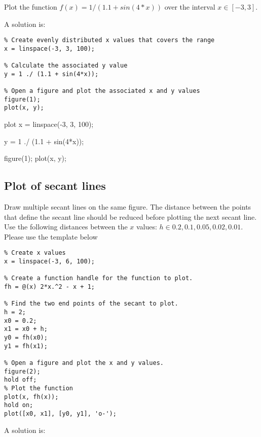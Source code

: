 \begin{ex}
Plot the function $f(x) = 1 / (1.1 + sin(4*x))$
over the interval $x \in [-3, 3]$.
\begin{hint}
\end{hint}
\begin{sol}
A solution is:
\begin{lstlisting}
% Create evenly distributed x values that covers the range
x = linspace(-3, 3, 100);

% Calculate the associated y value
y = 1 ./ (1.1 + sin(4*x));

% Open a figure and plot the associated x and y values
figure(1);
plot(x, y);
\end{lstlisting}
\end{sol}
\begin{solutionfile}{plot}
x = linspace(-3, 3, 100);

y = 1 ./ (1.1 + sin(4*x));

figure(1);
plot(x, y);
\end{solutionfile}
\end{ex}


\subsection{Plot of secant lines}

\begin{ex}
Draw multiple secant lines on the same figure.
The distance between the points that define the secant line
should be reduced before plotting the next secant line.
Use the following distances between the $x$ values:
$h \in {0.2, 0.1, 0.05, 0.02, 0.01}$.
Please use the template below
\begin{lstlisting}
% Create x values
x = linspace(-3, 6, 100);

% Create a function handle for the function to plot.
fh = @(x) 2*x.^2 - x + 1;

% Find the two end points of the secant to plot.
h = 2;
x0 = 0.2;
x1 = x0 + h;
y0 = fh(x0);
y1 = fh(x1);

% Open a figure and plot the x and y values.
figure(2);
hold off;
% Plot the function
plot(x, fh(x));
hold on;
plot([x0, x1], [y0, y1], 'o-');
\end{lstlisting}
\begin{hint}
\end{hint}
\begin{sol}
A solution is:
\begin{lstlisting}
\end{lstlisting}
\end{sol}
\end{ex}

